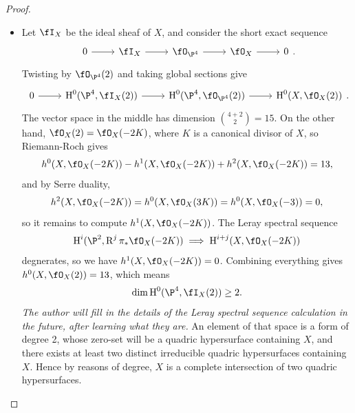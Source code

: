 \documentclass[a4paper]{article}
\begin{document}
\begin{enumerate} [label=\textbf{\arabic*.}, leftmargin=0em]
\begin{proof}
\begin{itemize} [leftmargin=0cm]
                        \item[(b)] Let $\fI_X$ be the ideal sheaf of $X$, and consider the short exact sequence
                              \[ \begin{tikzcd}
                                          0 \arrow[r] & \fI_X \arrow[r] & \fO_{\P^4} \arrow[r] & \fO_X \arrow[r] & 0
                                    \end{tikzcd} . \]
                              Twisting by $\fO_{\P^4}(2)$ and taking global sections give
                              \[ \begin{tikzcd}
                                          0 \arrow[r] & \cH^0(\P^4, \fI_X(2)) \arrow[r] & \cH^0(\P^4, \fO_{\P^4}(2)) \arrow[r] & \cH^0(X, \fO_X(2))
                                    \end{tikzcd} .\]
                              The vector space in the middle has dimension $\binom{4 + 2}{2} = 15$.
                              On the other hand, $\fO_X(2) = \fO_X(-2K)$, where $K$ is a canonical divisor of $X$, so Riemann-Roch gives
                              \begin{equation*}
                                    h^0(X, \fO_X(-2K)) - h^1(X, \fO_X(-2K)) + h^2(X, \fO_X(-2K)) = 13,
                              \end{equation*}
                              and by Serre duality,
                              \begin{equation*}
                                    h^2(X, \fO_X(-2K)) = h^0(X, \fO_X(3K)) = h^0(X, \fO_X(-3)) = 0,
                              \end{equation*}
                              so it remains to compute $h^1(X, \fO_X(-2K))$.
                              The Leray spectral sequence
                              \begin{equation*}
                                    \cH^i(\P^2, \dR^j \pi_*\fO_X(-2K)) \implies \cH^{i + j}(X, \fO_X(-2K))
                              \end{equation*}
                              degnerates, so we have $h^1(X, \fO_X(-2K)) = 0$.
                              Combining everything gives $h^0(X, \fO_X(2)) = 13$, which means
                              \begin{equation*}
                                    \dim \cH^0(\P^4, \fI_X(2)) \geq 2.
                              \end{equation*}
                              \textit{The author will fill in the details of the Leray spectral sequence calculation in the future, after learning what they are.}
                              An element of that space is a form of degree 2, whose zero-set will be a quadric hypersurface containing $X$, and there exists at least two distinct irreducible quadric hypersurfaces containing $X$.
                              Hence by reasons of degree, $X$ is a complete intersection of two quadric hypersurfaces.
                  \end{itemize}
            \end{proof}


\end{enumerate}
\end{document}
